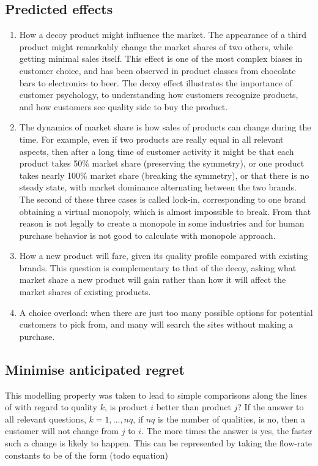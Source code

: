 \subsection{Predicted effects} \label{subsec:predicted}
\begin{enumerate}
	\item How a decoy product might influence the market.
	The appearance of a third product might remarkably change the market shares of two others, while getting minimal sales itself.
	This effect is one of the most complex biases in customer choice, and has been observed in product classes from chocolate bars
	to electronics to beer.
	The decoy effect illustrates the importance of customer psychology, to understanding how customers recognize products,
	and how customers see quality side to buy the product.

	\item The dynamics of market share is  how sales of products can change during the time.
	For example, even if two products are really equal in all relevant aspects, then after a long time of customer activity it might be that
	each product takes 50\% market share (preserving the symmetry), or one product takes nearly 100\% market share (breaking the symmetry),
	or that there is no steady state, with market dominance alternating between the two brands.
	The second of these three cases is called lock-in, corresponding to one brand obtaining a virtual monopoly,
	which is almost impossible to break.
	From that reason is not legally to create a monopole in some industries and for human purchase behavior is not
	good to calculate with monopole approach.

	\item How a new product will fare, given its quality profile compared with existing brands.
	This question is complementary to that of the decoy, asking what market share a new product will gain rather than how it will
	affect the market shares of existing products.

	\item A choice overload: when there are just too many possible options for potential customers to pick from, and many
	will search the sites without making a purchase.
\end{enumerate}

\subsection{Minimise anticipated regret} \label{subsec:regret}
This modelling property was taken to lead to simple comparisons along the lines of with regard to quality $k$,
is product $i$ better than product $j$?
If the answer to all relevant questions, $k = 1, . . . , nq$, if $nq$ is the number of qualities, is no, then a customer
will not change from $j$ to $i$.
The more times the answer is yes, the faster such a change is likely to happen.
This can be represented by taking the flow-rate constants to be of the form (todo equation)

